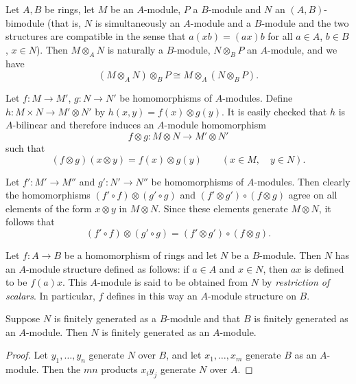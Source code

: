 \begin{exercise}\label{ex:bimodule-tensor}
Let $A, B$ be rings, let $M$ be an $A$-module, $P$ a $B$-module and $N$ an $(A, B)$-bimodule (that is, $N$ is simultaneously an $A$-module and a $B$-module and the two structures are compatible in the sense that $a(xb) = (ax)b$ for all $a \in A$, $b \in B$, $x \in N$). Then $M \otimes_A N$ is naturally a $B$-module, $N \otimes_B P$ an $A$-module, and we have
\[
    (M \otimes_A N) \otimes_B P \cong M \otimes_A (N \otimes_B P).
\]
\end{exercise}

Let $f \colon M \to M'$, $g \colon N \to N'$ be homomorphisms of $A$-modules. Define $h \colon M \times N \to M' \otimes N'$ by $h(x, y) = f(x) \otimes g(y)$. It is easily checked that $h$ is $A$-bilinear and therefore induces an $A$-module homomorphism
\[
    f \otimes g \colon M \otimes N \to M' \otimes N'
\]
such that
\[
    (f \otimes g)(x \otimes y) = f(x) \otimes g(y) \qquad (x \in M, \quad y \in N).
\]

Let $f' \colon M' \to M''$ and $g' \colon N' \to N''$ be homomorphisms of $A$-modules. Then clearly the homomorphisms $(f' \circ f) \otimes (g' \circ g)$ and $(f' \otimes g') \circ (f \otimes g)$ agree on all elements of the form $x \otimes y$ in $M \otimes N$. Since these elements generate $M \otimes N$, it follows that
\[
    (f' \circ f) \otimes (g' \circ g) = (f' \otimes g') \circ (f \otimes g).
\]


Let $f \colon A \to B$ be a homomorphism of rings and let $N$ be a $B$-module. Then $N$ has an $A$-module structure defined as follows: if $a \in A$ and $x \in N$, then $ax$ is defined to be $f(a)x$. This $A$-module is said to be obtained from $N$ by \emph{restriction of scalars}. In particular, $f$ defines in this way an $A$-module structure on $B$.

\begin{proposition}\label{prop:finitely-generated-restriction}
Suppose $N$ is finitely generated as a $B$-module and that $B$ is finitely generated as an $A$-module. Then $N$ is finitely generated as an $A$-module.
\end{proposition}

\begin{proof}
Let $y_1, \ldots, y_n$ generate $N$ over $B$, and let $x_1, \ldots, x_m$ generate $B$ as an $A$-module. Then the $mn$ products $x_i y_j$ generate $N$ over $A$.
\end{proof}

